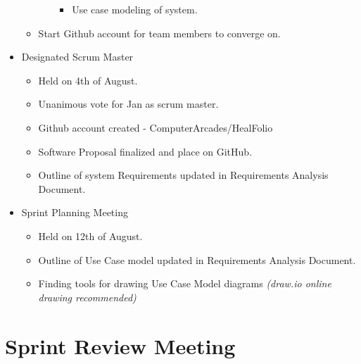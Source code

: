 \documentclass[a4paper]{article}
\begin{document}
\begin{itemize}
\begin{itemize}
\begin{itemize}
\begin{itemize}
\item Use case modeling of system.

\end{itemize}

\end{itemize}

\item Start Github account for team members to converge on. 

\end{itemize}

\item  Designated Scrum Master

\begin{itemize}

\item Held on 4th of August.

\item Unanimous vote for Jan as scrum master.

\item Github account created - ComputerArcades/HealFolio

\item Software Proposal finalized and place on GitHub.

\item Outline of system Requirements updated in Requirements Analysis Document.

\end{itemize}

\item Sprint Planning Meeting

\begin{itemize}

\item Held on 12th of August.

\item Outline of Use Case model updated in Requirements Analysis Document.

\item Finding tools for drawing Use Case Model diagrams \emph{(draw.io online drawing recommended)} 

\end{itemize}

\end{itemize}

\newpage

\section{Sprint Review Meeting}
\end{document}
